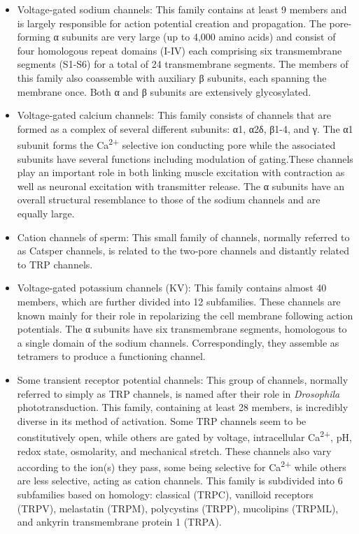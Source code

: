 \documentclass[]{book}
\providecommand{\tightlist}{%
  \setlength{\itemsep}{0pt}\setlength{\parskip}{0pt}}
\begin{document}
\begin{itemize}
\tightlist
\item
  Voltage-gated sodium channels: This family contains at least 9 members and is largely responsible for action potential creation and propagation. The pore-forming α subunits are very large (up to 4,000 amino acids) and consist of four homologous repeat domains (I-IV) each comprising six transmembrane segments (S1-S6) for a total of 24 transmembrane segments. The members of this family also coassemble with auxiliary β subunits, each spanning the membrane once. Both α and β subunits are extensively glycosylated.
\item
  Voltage-gated calcium channels: This family consists of channels that are formed as a complex of several different subunits: α1, α2δ, β1-4, and γ. The α1 subunit forms the Ca\textsuperscript{2+} selective ion conducting pore while the associated subunits have several functions including modulation of gating.These channels play an important role in both linking muscle excitation with contraction as well as neuronal excitation with transmitter release. The α subunits have an overall structural resemblance to those of the sodium channels and are equally large.
\item
  Cation channels of sperm: This small family of channels, normally referred to as Catsper channels, is related to the two-pore channels and distantly related to TRP channels.
\item
  Voltage-gated potassium channels (KV): This family contains almost 40 members, which are further divided into 12 subfamilies. These channels are known mainly for their role in repolarizing the cell membrane following action potentials. The α subunits have six transmembrane segments, homologous to a single domain of the sodium channels. Correspondingly, they assemble as tetramers to produce a functioning channel.
\item
  Some transient receptor potential channels: This group of channels, normally referred to simply as TRP channels, is named after their role in \emph{Drosophila} phototransduction. This family, containing at least 28 members, is incredibly diverse in its method of activation. Some TRP channels seem to be constitutively open, while others are gated by voltage, intracellular Ca\textsuperscript{2+}, pH, redox state, osmolarity, and mechanical stretch. These channels also vary according to the ion(s) they pass, some being selective for Ca\textsuperscript{2+} while others are less selective, acting as cation channels. This family is subdivided into 6 subfamilies based on homology: classical (TRPC), vanilloid receptors (TRPV), melastatin (TRPM), polycystins (TRPP), mucolipins (TRPML), and ankyrin transmembrane protein 1 (TRPA).

\end{itemize}
\end{document}
